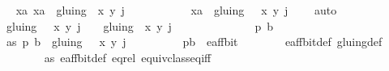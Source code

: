 \begin{isabellebody}
\ \isamarkupfalse%
\ {\isachardoublequoteopen}{\isasymAnd}xa{\isachardot}\ xa\ {\isasymin}\ gluing\ {\isacharbackquote}{\isacharbackquote}\ {\isacharbraceleft}{\isacharparenleft}{\isacharparenleft}x{\isacharcomma}\ y{\isacharparenright}{\isacharcomma}\ j{\isacharparenright}{\isacharbraceright}\ {\isasymLongrightarrow}\isanewline
\ \ \ \ \ \ \ \ \ \ xa\ {\isasymin}\ gluing\ {\isacharbackquote}{\isacharbackquote}\ {\isacharbraceleft}{\isacharparenleft}{\isasymtau}\ {\isacharparenleft}x{\isacharcomma}\ y{\isacharparenright}{\isacharcomma}\ j\ {\isacharplus}\ {}{\isacharparenright}{\isacharbraceright}{\isachardoublequoteclose}\ \isamarkupfalse%
\ auto\isanewline
\ \ \isamarkupfalse%
\isanewline
\isanewline
\ \ \isamarkupfalse%
\ {\isachardoublequoteopen}gluing\ {\isacharbackquote}{\isacharbackquote}\ {\isacharbraceleft}{\isacharparenleft}{\isasymtau}\ {\isacharparenleft}x{\isacharcomma}\ y{\isacharparenright}{\isacharcomma}\ j\ {\isacharplus}\ {}{\isacharparenright}{\isacharbraceright}\ {\isasymsubseteq}\ gluing\ {\isacharbackquote}{\isacharbackquote}\ {\isacharbraceleft}{\isacharparenleft}{\isacharparenleft}x{\isacharcomma}\ y{\isacharparenright}{\isacharcomma}\ j{\isacharparenright}{\isacharbraceright}{\isachardoublequoteclose}\isanewline
\ \ \isamarkupfalse%
\ \ \ \ \ \isanewline
\ \ \ \ \isacommand{{\isacharbraceleft}}\isamarkupfalse%
\isamarkupfalse%
\ p\ b\isanewline
\ \ \ \ \isamarkupfalse%
\ as{\isacharcolon}\ {\isachardoublequoteopen}{\isacharparenleft}p{\isacharcomma}\ b{\isacharparenright}\ {\isasymin}\ gluing\ {\isacharbackquote}{\isacharbackquote}\ {\isacharbraceleft}{\isacharparenleft}{\isasymtau}\ {\isacharparenleft}x{\isacharcomma}\ y{\isacharparenright}{\isacharcomma}\ j\ {\isacharplus}\ {}{\isacharparenright}{\isacharbraceright}{\isachardoublequoteclose}\isanewline
\ \ \ \ \isamarkupfalse%
\ \isamarkupfalse%
\ {\isachardoublequoteopen}{\isacharparenleft}p{\isacharcomma}b{\isacharparenright}\ {\isasymin}\ e{\isacharunderscore}aff{\isacharunderscore}bit{\isachardoublequoteclose}\isanewline
\ \ \ \ \ \ \isamarkupfalse%
\ e{\isacharunderscore}aff{\isacharunderscore}bit{\isacharunderscore}def\ gluing{\isacharunderscore}def\ \isanewline
\ \ \ \ \ \ \isamarkupfalse%
\ as\ e{\isacharunderscore}aff{\isacharunderscore}bit{\isacharunderscore}def\ eq{\isacharunderscore}rel\ equiv{\isacharunderscore}class{\isacharunderscore}eq{\isacharunderscore}iff\ \isamarkupfalse%

\end{isabellebody}

